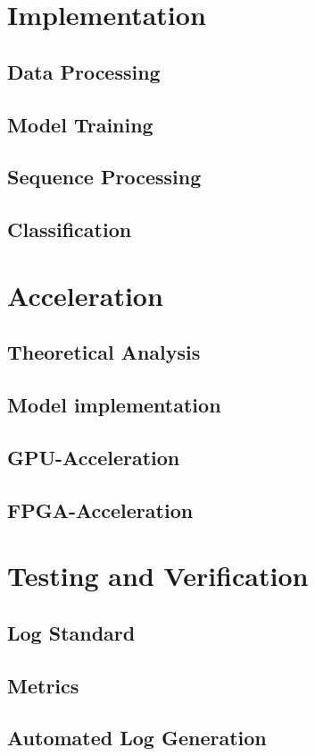 \documentclass[mscthesis]{usiinfthesis}
\begin{document}
\chapter{Implementation}
\section{Data Processing}
\section{Model Training}
\section{Sequence Processing}
\section{Classification}

\chapter{Acceleration}
\section{Theoretical Analysis}
\section{Model implementation}
\section{GPU-Acceleration}
\section{FPGA-Acceleration}

\chapter{Testing and Verification}
\section{Log Standard}
\section{Metrics}
\section{Automated Log Generation}
\end{document}
